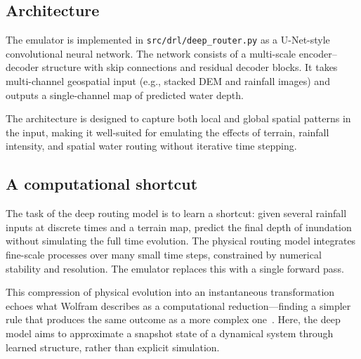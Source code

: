 \documentclass{article}
\begin{document}
\subsection{Architecture}
\label{sec:arch}

The emulator is implemented in \texttt{src/drl/deep\_router.py} as a U-Net-style convolutional neural network. The network consists of a multi-scale encoder–decoder structure with skip connections and residual decoder blocks. It takes multi-channel geospatial input (e.g., stacked DEM and rainfall images) and outputs a single-channel map of predicted water depth.

The architecture is designed to capture both local and global spatial patterns in the input, making it well-suited for emulating the effects of terrain, rainfall intensity, and spatial water routing without iterative time stepping.

\subsection{A computational shortcut}
\label{sec:comp}

The task of the deep routing model is to learn a shortcut: given several rainfall inputs at discrete times and a terrain map, predict the final depth of inundation without simulating the full time evolution. The physical routing model integrates fine-scale processes over many small time steps, constrained by numerical stability and resolution. The emulator replaces this with a single forward pass.

This compression of physical evolution into an instantaneous transformation echoes what Wolfram describes as a computational reduction—finding a simpler rule that produces the same outcome as a more complex one~\cite{wolfram2023second}. Here, the deep model aims to approximate a snapshot state of a dynamical system through learned structure, rather than explicit simulation.

  
  
\end{document}
